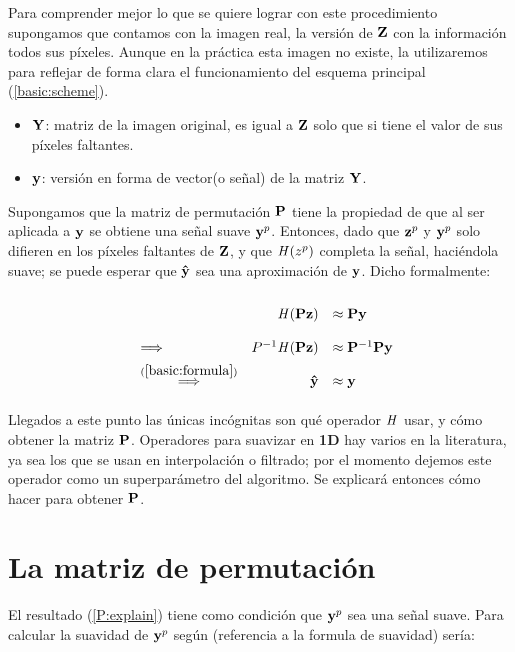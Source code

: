 Para comprender mejor lo que se quiere lograr con este procedimiento supongamos que contamos con la imagen real, la versi\'on de $\Z$ con la informaci\'on todos sus p\'ixeles. Aunque en la pr\'actica esta imagen no existe, la utilizaremos para reflejar de forma clara el funcionamiento del esquema principal (\ref{basic:scheme}).

\begin{itemize}
	\item $\Y$: matriz de la imagen original, es igual a $\Z$ solo que si tiene el valor de sus p\'ixeles faltantes. 
	\item $\y$: versión en forma de vector(o señal) de la matriz $\Y$.
\end{itemize}

Supongamos que la matriz de permutaci\'on $\P$ tiene la propiedad de que al ser aplicada a $\y$ se obtiene una señal suave $\y^p$. Entonces, dado que $\z^p$ y $\y^p$ solo difieren en los p\'ixeles faltantes de $\Z$, y que $\H(z^p)$ completa la señal, haciéndola suave; se puede esperar que $\yhat$ sea una aproximaci\'on de $\y$. Dicho formalmente:

\begin{equation}
	\def\arraystretch{2}
	\begin{array}{llrl}
	&                                        &     \H (\P\z ) &\approx \P\y        \\ 
	&\Longrightarrow                         & P^{-1}\H(\P\z) &\approx \P^{-1}\P\y \\
	&\overset{(\ref{basic:formula})}{\Longrightarrow} & \yhat &\approx \y          \\
	\end{array}
	\label{P:explain}
\end{equation}

Llegados a este punto las únicas incógnitas son qu\'e operador $\H$ usar, y c\'omo obtener la matriz $\P$. Operadores para suavizar en \textbf{1D} hay varios en la literatura, ya sea los que se usan en interpolaci\'on o filtrado; por el momento dejemos este operador como un superpar\'ametro del algoritmo. Se explicar\'a entonces c\'omo hacer para obtener $\P$.

\section{La matriz de permutaci\'on}

El resultado (\ref{P:explain}) tiene como condici\'on que $\y^p$ sea una señal suave. Para calcular la suavidad de $\y^p$ según (referencia a la formula de suavidad) ser\'ia:

